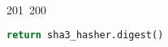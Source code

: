 201~200~\documentclass{article}
\begin{document}
\begin{lstlisting}[language=Python, caption=Server Password Hashing with SHA3-512]
	                                                                                                                                                                                                                                                                                                	                                                                                                                                        	    	                                                                                                	                                                                                                                                                                                                                                                                                                                                	                                                                        	                                                                        	                                                                                                                                        	                                                                                                                        return sha3_hasher.digest()
	                                                                                                                                                                                                                                                                                                	                                                                                                                                        	    	                                                                                                	                                                                                                                                                                                                                                                                                                                                	                                                                        	                                                                        	                                                                                                                                        	                                                                                                                        \end{lstlisting}
\end{document}
